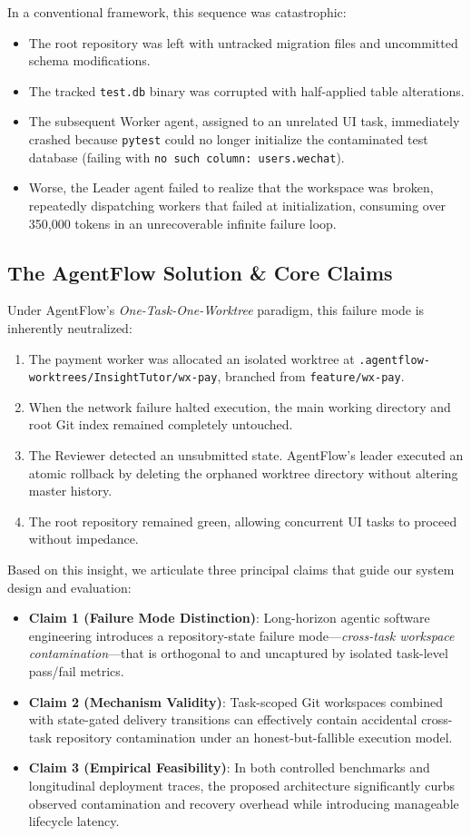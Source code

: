 \documentclass[conference]{IEEEtran}
\begin{document}
In a conventional framework, this sequence was catastrophic:
\begin{itemize}
    \item The root repository was left with untracked migration files and uncommitted schema modifications.
    \item The tracked \texttt{test.db} binary was corrupted with half-applied table alterations.
    \item The subsequent Worker agent, assigned to an unrelated UI task, immediately crashed because \texttt{pytest} could no longer initialize the contaminated test database (failing with \texttt{no such column: users.wechat}).
    \item Worse, the Leader agent failed to realize that the workspace was broken, repeatedly dispatching workers that failed at initialization, consuming over 350,000 tokens in an unrecoverable infinite failure loop.
\end{itemize}

\subsection{The AgentFlow Solution \& Core Claims}
Under AgentFlow's \textit{One-Task-One-Worktree} paradigm, this failure mode is inherently neutralized:
\begin{enumerate}
    \item The payment worker was allocated an isolated worktree at \texttt{.agentflow-worktrees/InsightTutor/wx-pay}, branched from \texttt{feature/wx-pay}.
    \item When the network failure halted execution, the main working directory and root Git index remained completely untouched.
    \item The Reviewer detected an unsubmitted state. AgentFlow's leader executed an atomic rollback by deleting the orphaned worktree directory without altering master history.
    \item The root repository remained green, allowing concurrent UI tasks to proceed without impedance.
\end{enumerate}

Based on this insight, we articulate three principal claims that guide our system design and evaluation:
\begin{itemize}
    \item \textbf{Claim 1 (Failure Mode Distinction)}: Long-horizon agentic software engineering introduces a repository-state failure mode---\textit{cross-task workspace contamination}---that is orthogonal to and uncaptured by isolated task-level pass/fail metrics.
    \item \textbf{Claim 2 (Mechanism Validity)}: Task-scoped Git workspaces combined with state-gated delivery transitions can effectively contain accidental cross-task repository contamination under an honest-but-fallible execution model.
    \item \textbf{Claim 3 (Empirical Feasibility)}: In both controlled benchmarks and longitudinal deployment traces, the proposed architecture significantly curbs observed contamination and recovery overhead while introducing manageable lifecycle latency.
\end{itemize}
\end{document}
